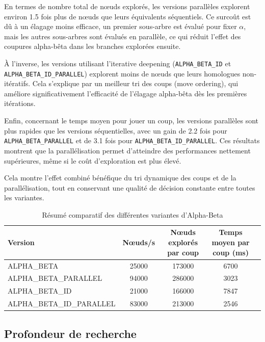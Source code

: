 \documentclass{article}
\begin{document}
En termes de nombre total de nœuds explorés, les versions parallèles explorent environ 1.5 fois plus de nœuds que leurs équivalents séquentiels. Ce surcoût est dû à un élagage moins efficace, un premier sous-arbre est évalué pour fixer $\alpha$, mais les autres sous-arbres sont évalués en parallèle, ce qui réduit l'effet des coupures alpha-bêta dans les branches explorées ensuite.

À l'inverse, les versions utilisant l'iterative deepening (\texttt{ALPHA\_BETA\_ID} et \texttt{ALPHA\_BETA\_ID\_PARALLEL}) explorent moins de nœuds que leurs homologues non-itératifs. Cela s'explique par un meilleur tri des coups (move ordering), qui améliore significativement l'efficacité de l'élagage alpha-bêta dès les premières itérations.

Enfin, concernant le temps moyen pour jouer un coup, les versions parallèles sont plus rapides que les versions séquentielles, avec un gain de 2.2 fois pour \texttt{ALPHA\_BETA\_PARALLEL} et de 3.1 fois pour \texttt{ALPHA\_BETA\_ID\_PARALLEL}. Ces résultats montrent que la parallélisation permet d'atteindre des performances nettement supérieures, même si le coût d'exploration est plus élevé.

Cela montre l'effet combiné bénéfique du tri dynamique des coups et de la parallélisation, tout en conservant une qualité de décision constante entre toutes les variantes.

\begin{table}[h]
    \centering
    \caption{Résumé comparatif des différentes variantes d'Alpha-Beta}
    \label{tab:ab_comparison}
    \begin{tabular}{|l|c|c|c|c|}
        \hline
        \textbf{Version} & \textbf{Nœuds/s} & \textbf{Nœuds explorés par coup} & \textbf{Temps moyen par coup (ms)} \\
        \hline
        ALPHA\_BETA & 25000 & 173000 & 6700 \\
        \hline
        ALPHA\_BETA\_PARALLEL & 94000 & 286000 & 3023 \\
        \hline
        ALPHA\_BETA\_ID & 21000 & 166000 & 7847 \\
        \hline
        ALPHA\_BETA\_ID\_PARALLEL & 83000 & 213000 & 2546 \\
        \hline
    \end{tabular}
\end{table}


\subsection{Profondeur de recherche}
\end{document}
